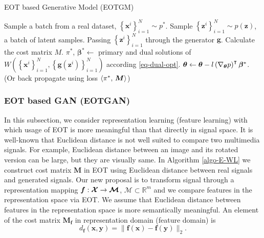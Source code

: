 \begin{algorithm}
  \caption{EOT based Generative Model (EOTGM)}\label{algo-E-WL}
  \begin{algorithmic}[1]
    \STATE Sample  a batch from a real dataset, $\left\{ \bm{x}^{i} \right\}_{i=1}^{N} \sim p^{\ast}$. 
    \STATE Sample $\left\{ \bm{z}^{i} \right\}_{i=1}^{N} \sim p(\bm{z})$, a batch of latent samples.
    \STATE Passing $\left\{ \bm{z}^{i} \right\}_{i=1}^{N}$ through the generator $\bm{g}$.
    \STATE Calculate the cost matrix $M$.
    \STATE $\pi^{\ast}$, $\bm{\beta}^{\ast} \gets$ primary and dual
    solutions of $W(\left\{ \bm{x}^{i} \right\}_{i=1}^{N}, \left\{
      \bm{g}(\bm{z}^{i})\right\}_{i=1}^{N})$ according \eqref{eq-dual-opt}.
    \STATE $\bm{\theta} \gets \bm{\theta} - l \left(\nabla_{\bm{\theta}}{p}\right)^{\intercal}
    \bm{\beta}^{\ast}$. (Or back propagate using loss $\langle \pi^{\ast},\,\bm{M}\rangle$)
    \ENDWHILE
  \end{algorithmic}
\end{algorithm}

\subsubsection{EOT based GAN (EOTGAN)}

In this subsection, we consider representation learning (feature
learning) with which usage of EOT is more meaningful than that
directly in signal space.
It is well-known that Euclidean distance is not well suited to compare
two multimedia signals. For example, Euclidean distance between an
image and its rotated version can be large, but they are visually same. In Algorithm \ref{algo-E-WL} we construct cost matrix $\bm{M}$ in EOT using 
Euclidean distance between real signals and generated signals. Our new proposal is to transform signal through a representation mapping 
$\bm{f}: \bm{\mathcal{X}} \rightarrow \bm{\mathcal{M}}$, $\bm{\mathcal{M}}\subset\mathbb{R}^{m}$ and we compare features in the representation space via EOT. We assume that Euclidean distance
between features in the representation space is more semantically
meaningful. An element of the cost matrix $\bm{M_f}$ in representation domain (feature domain) is
\begin{equation}\label{def-similarity}
  d_{\bm{f}}(\bm{x}, \bm{y}) = \|\bm{f}(\bm{x})-\bm{f}(\bm{y})\|_{2}.
\end{equation}

